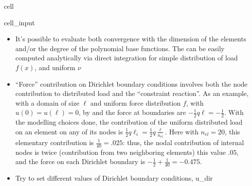 \documentclass[letterpaper,10pt,english]{jupyterBook}
\begin{document}
\begin{sphinxuseclass}{cell}\begin{sphinxVerbatimInput}

\begin{sphinxuseclass}{cell_input}
\begin{sphinxVerbatim}[commandchars=\\\{\}]
\end{sphinxVerbatim}

\end{sphinxuseclass}\end{sphinxVerbatimInput}

\end{sphinxuseclass}
\sphinxAtStartPar
{}
\begin{itemize}
\item {} 
\sphinxAtStartPar
{} It’s possible to evaluate both convergence with the dimension of the elements and/or the degree of the polynomial base functions. The  can be easily computed analytically via direct integration for simple distribution of load \(f(x)\), and uniform \(\nu\)

\item {} 
\sphinxAtStartPar
{} “Force” contribution on Dirichlet boundary conditions involves both the node contribution to distributed load and the “constraint reaction”. As an example, with a domain of size \(\ell\) and uniform force distribution \(f\), with \(u(0) = u(\ell) = 0\), by  and  the force at boundaries are \(-\frac{1}{2} q \ell = - \frac{1}{2}\). With the modelling choices done, the contribution of the uniform distributed load on an element on any of its nodes is \(\frac{1}{2} q \ell_i = \frac{1}{2} q \frac{\ell}{n_{el}}\). Here with \(n_{el} = 20\), this elementary contribution is \(\frac{1}{40} = .025\): thus, the nodal contribution of internal nodes is twice (contribution from two neighboring elements) this value \(.05\), and the force on each Dirichlet boundary is \(-\frac{1}{2} + \frac{1}{40} = - 0.475\).

\item {} 
\sphinxAtStartPar
Try to set different values of Dirichlet boundary conditions, u\_dir

\end{itemize}
\end{document}
